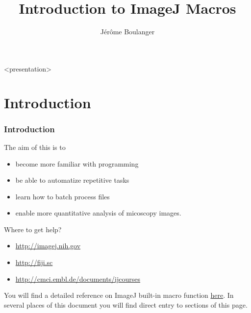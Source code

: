 
\usepackage{menukeys}

\usepackage{tikz}
\usetikzlibrary{calc,shapes,positioning}

\newcommand{\kw}[1]{\textcolor{orange}{\textbf{#1}}}
\newcommand{\code}[1] {\textcolor{gray}{\texttt{#1}}}
\setcounter{tocdepth}{1}
\title{Introduction to ImageJ Macros}
\author{J\'er\^ome Boulanger}
\date{}

\begin{frame}
  \maketitle
\end{frame}

\begin{frame}<presentation>
  \tiny \tableofcontents
\end{frame}

\section{Introduction}
\begin{frame}
  \frametitle<presentation>{Introduction}
  The aim of this  is to
  \begin{itemize}
  \item become more familiar with programming
  \item be able to automatize repetitive tasks
  \item learn how to batch process files
  \item enable more quantitative analysis of micoscopy images.
  \end{itemize}
  Where to get help?
  \begin{itemize}
  \item \url{http://imagej.nih.gov}
  \item \url{http://fiji.sc}
  \item \url{http://cmci.embl.de/documents/ijcourses}
  \end{itemize}
\end{frame}

You will find a detailed reference on ImageJ built-in macro function
\href{http://rsb.info.nih.gov/ij/developer/macro/functions.html}{here}. In
several places of this document you will find direct entry to sections
of this page.

